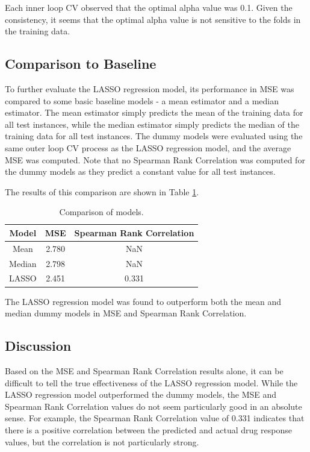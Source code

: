 \documentclass[11pt]{article}
\begin{document}
Each inner loop CV observed that the optimal alpha value was 0.1. Given the consistency, it seems that the optimal alpha value is not sensitive to the folds in the training data. 

\subsection{Comparison to Baseline}
To further evaluate the LASSO regression model, its performance in MSE was compared to some basic baseline models - a mean estimator and a median estimator. The mean estimator simply predicts the mean of the training data for all test instances, while the median estimator simply predicts the median of the training data for all test instances. The dummy models were evaluated using the same outer loop CV process as the LASSO regression model, and the average MSE was computed. Note that no Spearman Rank Correlation was computed for the dummy models as they predict a constant value for all test instances.

The results of this comparison are shown in Table \ref{tab:regression_baseline}.

\begin{table}[H]
    \centering
    \begin{tabular}{|c|c|c|}
        \hline
        Model & MSE & Spearman Rank Correlation \\
        \hline
        Mean & 2.780 & NaN \\
        Median & 2.798 & NaN \\
        LASSO & 2.451 & 0.331 \\
        \hline
    \end{tabular}
    \caption{Comparison of models.}
    \label{tab:regression_baseline}
\end{table}

\vspace{-0.5cm}

The LASSO regression model was found to outperform both the mean and median dummy models in MSE and Spearman Rank Correlation.

\subsection{Discussion}
Based on the MSE and Spearman Rank Correlation results alone, it can be difficult to tell the true effectiveness of the LASSO regression model. While the LASSO regression model outperformed the dummy models, the MSE and Spearman Rank Correlation values do not seem particularly good in an absolute sense. For example, the Spearman Rank Correlation value of 0.331 indicates that there is a positive correlation between the predicted and actual drug response values, but the correlation is not particularly strong. 
\end{document}
